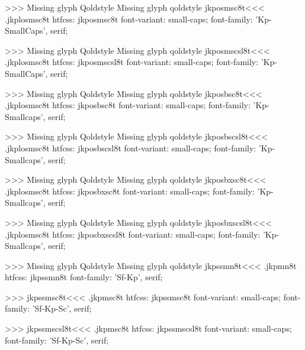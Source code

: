 >>>
Missing glyph	Qoldstyle
Missing glyph	qoldstyle
\<jkposmsc8t\><<<
.jkplosmsc8t
htfcss:  jkposmsc8t  font-variant: small-caps; font-family: 'Kp-SmallCaps', serif;

>>>
Missing glyph	Qoldstyle
Missing glyph	qoldstyle
\<jkposmscsl8t\><<<
.jkplosmsc8t
htfcss:  jkposmscsl8t  font-variant: small-caps; font-family: 'Kp-SmallCaps', serif;

>>>
Missing glyph	Qoldstyle
Missing glyph	qoldstyle
\<jkposbsc8t\><<<
.jkplosmsc8t
htfcss:  jkposbsc8t  font-variant: small-caps; font-family: 'Kp-Smallcaps', serif;

>>>
Missing glyph	Qoldstyle
Missing glyph	qoldstyle
\<jkposbscsl8t\><<<
.jkplosmsc8t
htfcss:  jkposbscsl8t  font-variant: small-caps; font-family: 'Kp-Smallcaps', serif;

>>>
Missing glyph	Qoldstyle
Missing glyph	qoldstyle
\<jkposbxsc8t\><<<
.jkplosmsc8t
htfcss:  jkposbxsc8t  font-variant: small-caps; font-family: 'Kp-Smallcaps', serif;

>>>
Missing glyph	Qoldstyle
Missing glyph	qoldstyle
\<jkposbxscsl8t\><<<
.jkplosmsc8t
htfcss:  jkposbxscsl8t  font-variant: small-caps; font-family: 'Kp-Smallcaps', serif;

>>>
Missing glyph	Qoldstyle
Missing glyph	qoldstyle
\<jkpssmn8t\><<<
.jkpmn8t
htfcss:  jkpssmn8t  font-family: 'Sf-Kp', serif;

>>>
\<jkpssmsc8t\><<<
.jkpmsc8t
htfcss:  jkpssmsc8t  font-variant: small-caps; font-family: 'Sf-Kp-Sc', serif;

>>>
\<jkpssmscsl8t\><<<
.jkpmsc8t
htfcss:  jkpssmscsl8t  font-variant: small-caps; font-family: 'Sf-Kp-Sc', serif;

